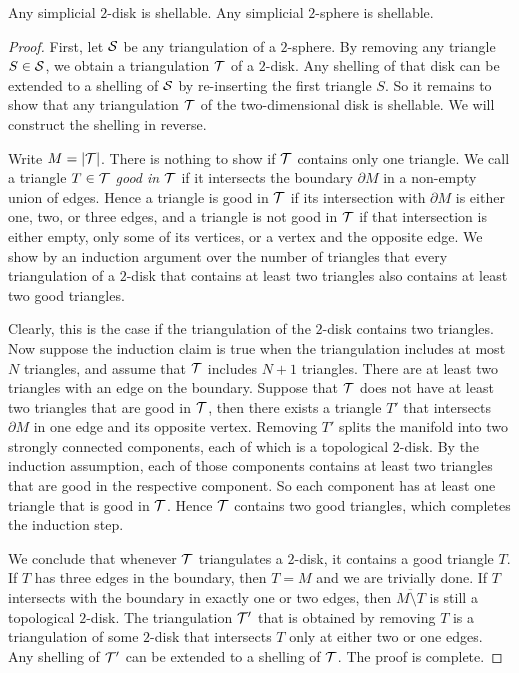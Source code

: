 \documentclass[10pt,letterpaper]{article}
\begin{document}
\begin{lemma}    
    Any simplicial $2$-disk is shellable.
    Any simplicial $2$-sphere is shellable. 
\end{lemma}
\begin{proof}
    First, 
    let ${\mathcal S}$ be any triangulation of a $2$-sphere. 
    By removing any triangle $S \in {\mathcal S}$, we obtain a triangulation ${\mathcal T}$ of a $2$-disk.
    Any shelling of that disk can be extended to a shelling of ${\mathcal S}$ by re-inserting the first triangle $S$.
    So it remains to show that any triangulation ${\mathcal T}$ of the two-dimensional disk is shellable. 
    We will construct the shelling in reverse. 
    
    Write $M = |{\mathcal T}|$. 
    There is nothing to show if ${\mathcal T}$ contains only one triangle. 
    We call a triangle $T \in {\mathcal T}$ \emph{good in ${\mathcal T}$} if it intersects the boundary $\partial M$ in a non-empty union of edges. 
    Hence a triangle is good in ${\mathcal T}$ if its intersection with $\partial M$ is either one, two, or three edges,
    and a triangle is not good in ${\mathcal T}$ if that intersection is either empty, only some of its vertices, or a vertex and the opposite edge.
    We show by an induction argument over the number of triangles that every triangulation of a $2$-disk that contains at least two triangles also contains at least two good triangles. 

    Clearly, this is the case if the triangulation of the $2$-disk contains two triangles. 
    Now suppose the induction claim is true when the triangulation includes at most $N$ triangles,
    and assume that ${\mathcal T}$ includes $N+1$ triangles. 
    There are at least two triangles with an edge on the boundary. 
    Suppose that ${\mathcal T}$ does not have at least two triangles that are good in ${\mathcal T}$,
    then there exists a triangle $T'$ that intersects $\partial M$ 
    in one edge and its opposite vertex.
    Removing $T'$ splits the manifold into two strongly connected components, each of which is a topological $2$-disk.
    By the induction assumption, each of those components contains at least two triangles 
    that are good in the respective component. 
    So each component has at least one triangle that is good in ${\mathcal T}$. 
    Hence ${\mathcal T}$ contains two good triangles, which completes the induction step. 
    
    We conclude that whenever ${\mathcal T}$ triangulates a $2$-disk,
    it contains a good triangle $T$. 
    If $T$ has three edges in the boundary, then $T = M$ and we are trivially done. 
    If $T$ intersects with the boundary in exactly one or two edges, 
    then $\overline{M \setminus T}$ is still a topological $2$-disk.
    The triangulation ${\mathcal T}'$ that is obtained by removing $T$
    is a triangulation of some $2$-disk that intersects $T$ only at either two or one edges.
    Any shelling of ${\mathcal T}'$ can be extended to a shelling of ${\mathcal T}$.
    The proof is complete. 
\end{proof}
\end{document}
